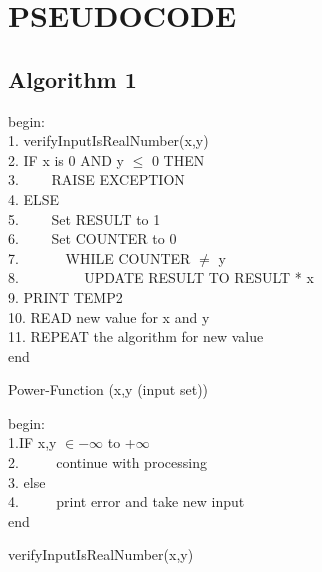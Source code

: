 \documentclass[a4paper,12pt]{article}
\begin{document}


\section{PSEUDOCODE}

\subsection{Algorithm 1}
\begin{algorithm}[H]
	begin: \\
	1. verifyInputIsRealNumber(x,y)\\
	2. IF x is 0 AND y $\leq$ 0 THEN \\
	3. $\hspace{2em}$RAISE EXCEPTION	\\
	4. ELSE \\
	5. $\hspace{2em}$Set RESULT to 1 \\
	6. $\hspace{2em}$Set COUNTER to 0\\
	7. $\hspace{3em}$WHILE COUNTER $\neq$ y \\
	8. $\hspace{4em}$ UPDATE RESULT TO RESULT * x\\
	9. 	PRINT TEMP2 \\
	10. READ new value for x and y\\
	11. REPEAT the algorithm for new value \\
	end
	\caption{Power-Function (x,y (input set))}
\end{algorithm}

\vspace{1cm}

\begin{algorithm}
	begin:\\
	1.IF  x,y $\in -\infty$  to  +$\infty$ \\
	2. $\hspace{2em}$ continue with processing\\
	3. else\\
	4. $\hspace{2em}$ print error and take new input \\
	end
	\caption{verifyInputIsRealNumber(x,y)}
\end{algorithm}
\end{document}
